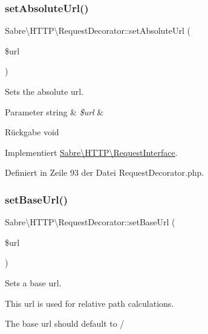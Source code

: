 \subsubsection{\texorpdfstring{set\+Absolute\+Url()}{setAbsoluteUrl()}}
{\footnotesize\ttfamily Sabre\textbackslash{}\+H\+T\+T\+P\textbackslash{}\+Request\+Decorator\+::set\+Absolute\+Url (\begin{DoxyParamCaption}\item[{}]{\$url }\end{DoxyParamCaption})}

Sets the absolute url.


\begin{DoxyParams}[1]{Parameter}
string & {\em \$url} & \\
\hline
\end{DoxyParams}
\begin{DoxyReturn}{Rückgabe}
void 
\end{DoxyReturn}


Implementiert \mbox{\hyperlink{interface_sabre_1_1_h_t_t_p_1_1_request_interface_a83a1eb456bef5552d0cbaae761f91ac1}{Sabre\textbackslash{}\+H\+T\+T\+P\textbackslash{}\+Request\+Interface}}.



Definiert in Zeile 93 der Datei Request\+Decorator.\+php.

\mbox{\label{class_sabre_1_1_h_t_t_p_1_1_request_decorator_ade9d2cb79ced7689675d480ffe5cf781}} 
\subsubsection{\texorpdfstring{set\+Base\+Url()}{setBaseUrl()}}
{\footnotesize\ttfamily Sabre\textbackslash{}\+H\+T\+T\+P\textbackslash{}\+Request\+Decorator\+::set\+Base\+Url (\begin{DoxyParamCaption}\item[{}]{\$url }\end{DoxyParamCaption})}

Sets a base url.

This url is used for relative path calculations.

The base url should default to /



